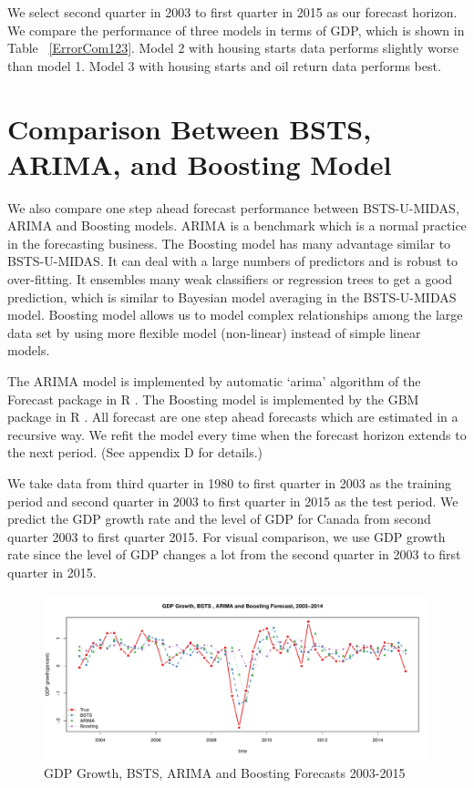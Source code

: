 We select second quarter in 2003  to first quarter  in 2015  as our forecast horizon. We compare the performance of three models in terms of GDP, which is shown in Table ~\ref{ErrorCom123}.  Model 2 with housing starts data  performs slightly worse than model 1. Model 3 with housing starts and oil return data performs best.

\section{Comparison Between BSTS, ARIMA, and Boosting Model}

We also compare one step ahead forecast performance between BSTS-U-MIDAS, ARIMA and Boosting models. ARIMA is a benchmark which is a normal practice in the  forecasting business. The Boosting model has many advantage similar to BSTS-U-MIDAS. It can deal with a large numbers of predictors and is robust to over-fitting. It ensembles many weak classifiers or regression trees to get a good prediction, which is similar to Bayesian model averaging in the BSTS-U-MIDAS model. Boosting model allows us to model complex relationships among the large data set by using more flexible model (non-linear) instead of simple linear models\cite{Varian}.  


The ARIMA model is implemented by automatic `arima' algorithm of the Forecast package in R \cite{Hyndman2008}. The Boosting model is implemented by the GBM package in R \cite{Ridgeway2015}. All forecast are one step ahead  forecasts which are estimated in a recursive way. We refit the model every time when the forecast horizon extends to the next period. (See appendix D for details.)

We take data from third quarter in 1980  to first quarter in 2003 as the training period and second quarter in 2003 to  first quarter in 2015 as the test period. We predict the GDP growth rate and the level of GDP for Canada from second quarter 2003 to  first quarter 2015. For visual comparison, we use GDP growth rate since the level of GDP changes a lot from the second quarter in 2003 to  first quarter in 2015. 


\begin{figure}[h]
	\centering
	\includegraphics[width=1\linewidth]{Figures/bsts_arima_boost}
	\caption{GDP Growth, BSTS, ARIMA and Boosting Forecasts 2003-2015 }
	\label{fig:comparison}
\end{figure}


